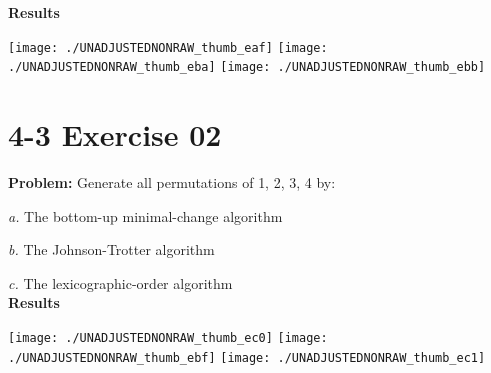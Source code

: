 \documentclass[paper=a4, fontsize=11pt]{scrartcl} %
\numberwithin{equation}{section}
\numberwithin{figure}{section}
\numberwithin{table}{section}
\begin{document}
\textbf{Results}

\texttt{[image: ./UNADJUSTEDNONRAW\_thumb\_eaf]}
\texttt{[image: ./UNADJUSTEDNONRAW\_thumb\_eba]}
\texttt{[image: ./UNADJUSTEDNONRAW\_thumb\_ebb]}

\pagebreak


\section{4-3 Exercise 02}

\textbf{Problem:} Generate all permutations of {1, 2, 3, 4} by:

\textit{a.} The bottom-up minimal-change algorithm

\textit{b.} The Johnson-Trotter algorithm

\textit{c.} The lexicographic-order algorithm \\

\textbf{Results}

\texttt{[image: ./UNADJUSTEDNONRAW\_thumb\_ec0]}
\texttt{[image: ./UNADJUSTEDNONRAW\_thumb\_ebf]}
\texttt{[image: ./UNADJUSTEDNONRAW\_thumb\_ec1]}

\pagebreak

\end{document}
